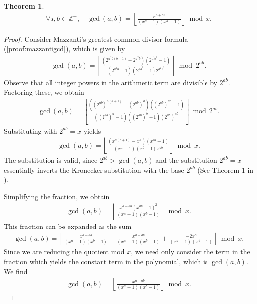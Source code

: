 \documentclass[11pt,reqno]{article}
\theoremstyle{plain}
\newtheorem{theorem}{Theorem}
\theoremstyle{definition}
\newcommand{\floor}[1]{\left\lfloor #1 \right\rfloor}
\newcommand{\Z}{\mathbb{Z}}
\begin{document}
\begin{theorem} \label{proof:gcdpolynomial}
\begin{align*}
\forall a,b \in \Z^+, \quad
\gcd(a,b) = \floor{\frac{x^{a+ab}}{(x^a - 1)(x^b-1)}}\bmod x .
\end{align*}
\end{theorem}
\begin{proof}
Consider Mazzanti's greatest common divisor formula (\cref{proof:mazzantigcd}), which is given by
\begin{align*}
\gcd(a,b) = \floor{\frac{(2^{a^2 b(b+1)} - 2^{a^2 b}) (2^{a^2 b^2} - 1)}
         {(2^{a^2 b} - 1)(2^{ab^2}-1)2^{a^2 b^2}}} \bmod 2^{ab}.
\end{align*}
Observe that all integer powers in the arithmetic term are divisible by $2^{ab}$. Factoring these, we obtain
\begin{align*}
\gcd(a,b) = \floor{\frac{((2^{ab})^{a (b+1)} - (2^{ab})^a) ((2^{ab})^{ab} - 1)}
 {((2^{ab})^{a} - 1)((2^{ab})^{b}-1) (2^{ab})^{ab}}} \bmod 2^{ab} .
\end{align*}
Substituting with $2^{ab} = x$ yields
\begin{align*}
\gcd(a,b) = \floor{\frac{(x^{a (b+1)} - x^a) (x^{ab} - 1)}
 {(x^{a} - 1)(x^{b}-1) x^{ab}}} \bmod x .
\end{align*}
The substitution is valid, since $2^{ab} > \gcd(a,b)$ and the substitution $2^{ab} = x$ essentially inverts the Kronecker substitution with the base $2^{ab}$ (See Theorem 1 in \cite{shunia2023simple}).

Simplifying the fraction, we obtain
\begin{align*}
\gcd(a,b) = \floor{
\frac
{ x^{a-ab} (x^{ab} - 1)^2 }
{ (x^a - 1)(x^b-1) }
}
 \bmod x .
\end{align*}
This fraction can be expanded as the sum
\begin{align*}
\gcd(a,b) = \floor{
    \frac
    { x^{a-ab} }
    { (x^a - 1)(x^b-1) }
    +
    \frac
    { x^{a+ab} }
    { (x^a - 1)(x^b-1) }
    +
    \frac
    { -2x^{a} }
    { (x^a - 1)(x^b-1) }
}
 \bmod x .
\end{align*}
Since we are reducing the quotient mod $x$, we need only consider the term in the fraction which yields the constant term in the polynomial, which is $\gcd(a,b)$. We find
\begin{align*}
\gcd(a,b) = \floor{\frac{x^{a+ab}}{(x^a-1)(x^b-1)}}\bmod x .
\end{align*}
\end{proof}
\end{document}
